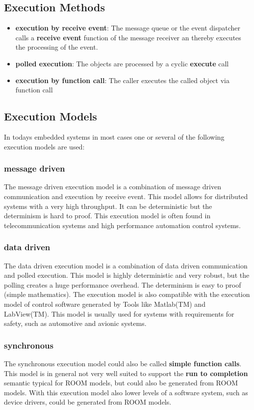 \subsection{Execution Methods}

\begin{itemize}
\item \textbf{execution by receive event}: The message queue or the event dispatcher calls a \textbf{receive event} function of the message receiver an thereby executes the processing of the event.
\item \textbf{polled execution}: The objects are processed by a cyclic \textbf{execute} call
\item \textbf{execution by function call}: The caller executes the called object via function call
\end{itemize}

\subsection{Execution Models}

In todays embedded systems in most cases one or several of the following execution models are used:

\subsubsection{message driven}

The message driven execution model is a combination of message driven communication and execution by receive event.
This model allows for distributed systems with a very high throughput.
It can be deterministic but the determinism is hard to proof.
This execution model is often found in telecommunication systems and high performance automation control systems.

\subsubsection{data driven}

The data driven execution model is a combination of data driven communication and polled execution.
This model is highly deterministic and very robust, but the polling creates a huge performance overhead.
The determinism is easy to proof (simple mathematics). 
The execution model is also compatible with the execution model of control software generated by Tools like Matlab(TM) and LabView(TM).
This model is usually used for systems with requirements for safety, such as automotive and avionic systems.

\subsubsection{synchronous}

The synchronous execution model could also be called \textbf{simple function calls}. 
This model is in general not very well suited to support the \textbf{run to completion} semantic typical for ROOM models, but could also be generated from ROOM models. 
With this execution model also lower levels of a software system, such as device drivers, could be generated from ROOM models.
